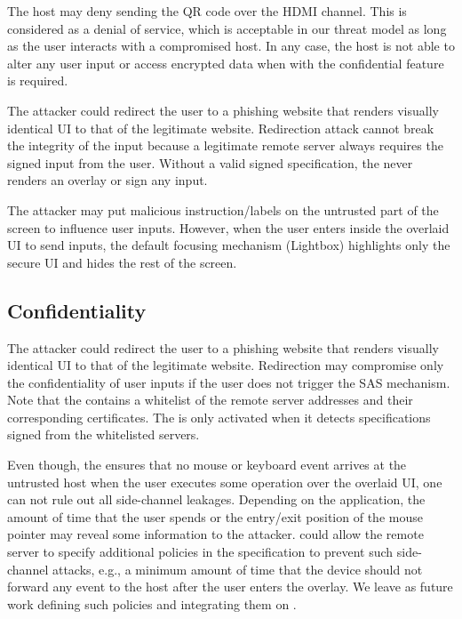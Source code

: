  The host may deny sending the QR code over the HDMI channel. This is considered as a denial of service, which is acceptable in our threat model as long as the user interacts with a compromised host. 
In any case, the host is not able to alter any user input or access encrypted data when \name with the confidential feature is required.

 The attacker could redirect the user to a phishing website that renders visually identical UI to that of the legitimate website. Redirection attack cannot break the integrity of the input because a legitimate remote server always requires the signed input from the user. Without a valid signed specification, the \device never renders an overlay or sign any input. 

 The attacker may put malicious instruction/labels on the untrusted part of the screen to influence user inputs. However, when the user enters inside the overlaid UI to send inputs, the default focusing mechanism (Lightbox) highlights only the secure UI and hides the rest of the screen. 

\subsection{Confidentiality}

 The attacker could redirect the user to a phishing website that renders visually identical UI to that of the legitimate website. Redirection may compromise only the confidentiality of user inputs if the user does not trigger the SAS mechanism. Note that the \device contains a whitelist of the remote server addresses and their corresponding certificates. The \device is only activated when it detects specifications signed from the whitelisted servers.

 Even though, the \device ensures that no mouse or keyboard event arrives at the untrusted host when the user executes some operation over the overlaid UI, one can not rule out all side-channel leakages. Depending on the application, the amount of time that the user spends or the entry/exit position of the mouse pointer may reveal some information to the attacker. 
\device could allow the remote server to specify additional policies in the specification to prevent such side-channel attacks, e.g., a minimum amount of time that the device should not forward any event to the host after the user enters the overlay. We leave as future work defining such policies and integrating them on \name.

